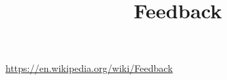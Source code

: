 \documentclass[a4paper]{article}
\title{Feedback}
\date{}
\begin{document}
    \maketitle

    \url{https://en.wikipedia.org/wiki/Feedback}
\end{document}
